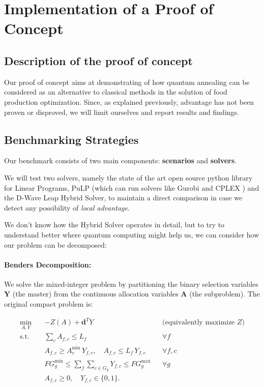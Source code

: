 \section{Implementation of a Proof of Concept}




\subsection{Description of the proof of concept}

Our proof of concept aims at demonstrating of how quantum annealing can be considered as an alternative to classical methods in the solution of food production optimization. Since, as explained previously, advantage has not been proven or disproved, we will limit ourselves and report results and findings.


\subsection{Benchmarking Strategies}

Our benchmark consists of two main components: \textbf{scenarios} and \textbf{solvers}.

We will test two solvers, namely the state of the art open source python library for Linear Programs, PuLP (which can run solvers like Gurobi \cite{gurobi2023} and CPLEX \cite{cplex2023}) and the D-Wave Leap Hybrid Solver, to maintain a direct comparison in case we detect any possibility of \textit{local advantage}.

We don't know how the Hybrid Solver operates in detail, but to try to understand better where quantum computing might help us, we can consider how our problem can be decomposed:

\paragraph{Benders Decomposition:}

We solve the mixed-integer problem by partitioning the binary selection variables $\mathbf{Y}$ (the master) from the continuous allocation variables $\mathbf{A}$ (the subproblem). The original compact problem is:

\begin{align}
\min_{A,Y}\quad & -Z(A) + \mathbf{d}^T Y
    && \text{(equivalently maximize $Z$)} \\
\text{s.t.}\quad
& \sum_{c} A_{f,c} \le L_f
    && \forall f \\
& A_{f,c} \ge A^{\min}_c\, Y_{f,c}, \quad
  A_{f,c} \le L_f\, Y_{f,c}
    && \forall f,c \\
& FG^{\min}_g \le \sum_{f}\sum_{c\in G_g} Y_{f,c} \le FG^{\max}_g
    && \forall g \\
& A_{f,c} \ge 0,\quad Y_{f,c}\in\{0,1\}.
\end{align}


